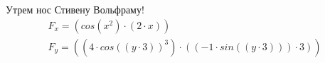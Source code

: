 \documentclass{article}
\begin{document}
\par Утрем нос Стивену Вольфраму!
\begin{gather*}
F_{x} = \left(cos\left(x ^ {2}\right) \cdot \left(2 \cdot x\right)\right)\\
F_{y} = \left(\left(4 \cdot cos\left(\left(y \cdot 3\right)\right) ^ {3}\right) \cdot \left(\left(-1 \cdot sin\left(\left(y \cdot 3\right)\right)\right) \cdot 3\right)\right)\\
\end{gather*}
\end{document}
